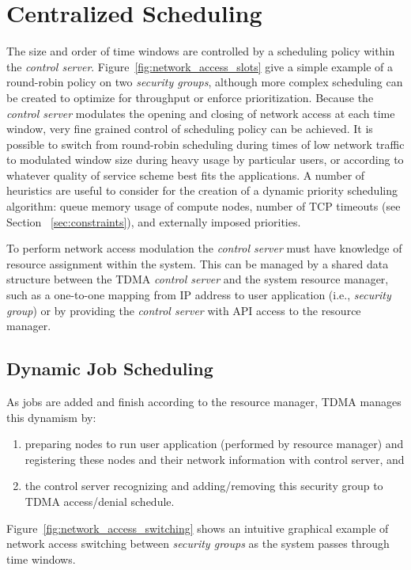 \documentclass[oneside,12pt]{memoir}
\begin{document}
\section{Centralized Scheduling}
The size and order of time windows are controlled by a scheduling policy within the \textit{control server}. Figure~\ref{fig:network_access_slots} give a simple example of a round-robin policy on two \textit{security groups}, although more complex scheduling can be created to optimize for throughput or enforce prioritization. Because the \textit{control server} modulates the opening and closing of network access at each time window, very fine grained control of scheduling policy can be achieved. It is possible to switch from round-robin scheduling during times of low network traffic to modulated window size during heavy usage by particular users, or according to whatever quality of service scheme best fits the applications. A number of heuristics are useful to consider for the creation of a dynamic priority scheduling algorithm: queue memory usage of compute nodes, number of TCP timeouts (see Section ~\ref{sec:constraints}), and externally imposed priorities. 

To perform network access modulation the \textit{control server} must have knowledge of resource assignment within the system. This can be managed by a shared data structure between the TDMA \textit{control server} and the system resource manager, such as a one-to-one mapping from IP address to user application (i.e., \textit{security group}) or by providing the \textit{control server} with API access to the resource manager.

\subsection{Dynamic Job Scheduling}
As jobs are added and finish according to the resource manager, TDMA manages this dynamism by:
\begin{enumerate}
\item preparing nodes to run user application (performed by resource manager) and registering these nodes and their network information with control server, and
\item the control server recognizing and adding/removing this security group to TDMA access/denial schedule.
\end{enumerate}

Figure~\ref{fig:network_access_switching} shows an intuitive graphical example of network access switching between \textit{security groups} as the system passes through time windows.
\end{document}
